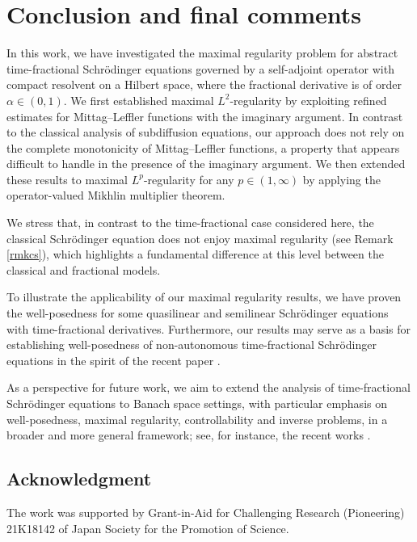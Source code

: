 \documentclass[reqno]{amsart}
\numberwithin{equation}{section}
\begin{document}
\section{Conclusion and final comments}
In this work, we have investigated the maximal regularity problem for abstract time-fractional Schrödinger equations governed by a self-adjoint operator with compact resolvent on a Hilbert space, where the fractional derivative is of order $\alpha\in (0,1)$. We first established maximal $L^2$-regularity by exploiting refined estimates for Mittag–Leffler functions with the imaginary argument. In contrast to the classical analysis of subdiffusion equations, our approach does not rely on the complete monotonicity of Mittag–Leffler functions, a property that appears difficult to handle in the presence of the imaginary argument. We then extended these results to maximal $L^p$-regularity for any $p\in (1,\infty)$ by applying the operator-valued Mikhlin multiplier theorem.

We stress that, in contrast to the time-fractional case considered here, the classical Schrödinger equation does not enjoy maximal regularity (see Remark \ref{rmkcs}), which highlights a fundamental difference at this level between the classical and fractional models.

To illustrate the applicability of our maximal regularity results, we have proven the well-posedness for some quasilinear and semilinear Schr\"odinger equations with time-fractional derivatives. Furthermore, our results may serve as a basis for establishing well-posedness of non-autonomous time-fractional Schrödinger equations in the spirit of the recent paper \cite{Ach24}.

As a perspective for future work, we aim to extend the analysis of time-fractional Schrödinger equations to Banach space settings, with particular emphasis on well-posedness, maximal regularity, controllability and inverse problems, in a broader and more general framework; see, for instance, the recent works \cite{BCEM26, CEMYIP25}.

\subsection*{Acknowledgment}
The work was supported by Grant-in-Aid for Challenging Research (Pioneering) 21K18142 of Japan Society for the Promotion of Science.
\end{document}
